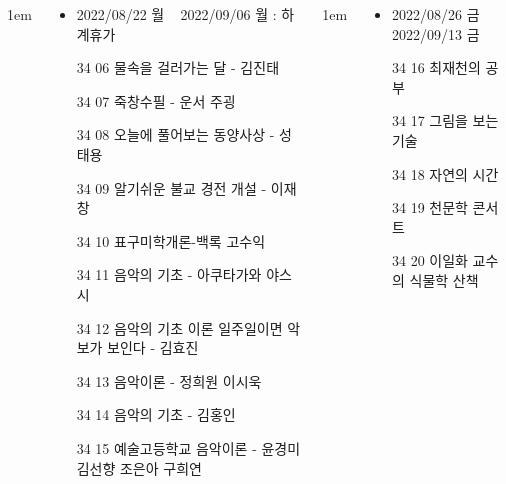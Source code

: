 \documentclass[	20pt, 
							a1paper, 
							portrait, %
							margin=0mm, %
							innermargin=10mm,  		%
							colspace=5mm, 
							subcolspace=0mm
							]{tikzposter}
\begin{document}
\begin{columns}
			{
					\setlength{\leftmargini}{4em}
					\setlength{\labelsep} {1em}
				\begin{LARGE}

					\begin{itemize}
					\item 	2022/08/22 월 ~ 2022/09/06 월 : 하계휴가
					\item 	[34 06] 물속을 걸러가는 달 - 김진태
					\item 	[34 07] 죽창수필 - 운서 주굉
					\item 	[34 08] 오늘에 풀어보는 동양사상 - 성태용
					\item 	[34 09] 알기쉬운 불교 경전 개설 - 이재창
					\item 	[34 10] 표구미학개론-백록 고수익
					\item 	[34 11] 음악의 기초 - 아쿠타가와 야스시 
					\item 	[34 12] 음악의 기초 이론 일주일이면 악보가 보인다 - 김효진
					\item 	[34 13] 음악이론 - 정희원 이시욱
					\item 	[34 14]  음악의 기초 - 김홍인
					\item 	[34 15] 예술고등학교 음악이론 - 윤경미 김선향 조은아 구희연
					\end{itemize}

				\end{LARGE}
			}


			{
					\setlength{\leftmargini}{4em}
					\setlength{\labelsep} {1em}
				\begin{LARGE}

					\begin{itemize}
					\item 	2022/08/26 금 ~ 2022/09/13 금 
					\item 	[34 16] 최재천의 공부
					\item 	[34 17] 그림을 보는 기술
					\item 	[34 18] 자연의 시간
					\item 	[34 19] 천문학 콘서트
					\item 	[34 20] 이일화 교수의 식물학 산책
					\end{itemize}

				\end{LARGE}
			}






\end{columns}
\end{document}
